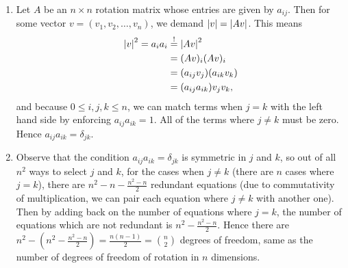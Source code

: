 \documentclass[11pt]{article}
\begin{document}
\begin{enumerate}
    \item Let $A$ be an $n\times n$ rotation matrix whose entries are given by $a_{ij}$. Then for some vector $v = (v_1,v_2,\dots,v_n)$, we demand $\abs{v} = \abs{Av}$. This means \begin{align*}
        \abs{v}^2 = a_ia_i &\overset{!}{=} \abs{Av}^2 \\
        &= (Av)_i(Av)_i \\
        &= (a_{ij}v_j)(a_{ik}v_k)\\
        &= (a_{ij}a_{ik})v_jv_k,
    \end{align*} and because $0\leq i,j,k \leq n$, we can match terms when $j=k$ with the left hand side by enforcing $a_{ij}a_{ik} = 1$. All of the terms where $j\neq k$ must be zero. Hence $a_{ij}a_{ik} = \delta_{jk}$.

    \item Observe that the condition $a_{ij}a_{ik} = \delta_{jk}$ is symmetric in $j$ and $k$, so out of all $n^2$ ways to select $j$ and $k$, for the cases when $j\neq k$ (there are $n$ cases where $j=k$), there are $n^2-n-\frac{n^2-n}{2}$ redundant equations (due to commutativity of multiplication, we can pair each equation where $j\neq k$ with another one). Then by adding back on the number of equations where $j=k$, the number of equations which are not redundant is $n^2-\frac{n^2-n}{2}$. Hence there are $n^2-\left(n^2-\frac{n^2-n}{2}\right) = \frac{n(n-1)}{2} = \binom{n}{2}$ degrees of freedom, same as the number of degrees of freedom of rotation in $n$ dimensions.
\end{enumerate}
\end{document}
